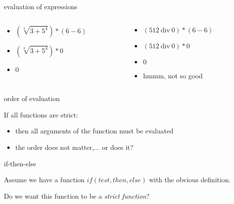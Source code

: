 \begin{frame}{evaluation of expressions}
\begin{columns}
 \begin{column}{0.5\linewidth}
  \begin{itemize}
   \pause \item $(\sqrt[3]{3 + 5^4}) * (6 - 6)$
   \pause \item $(\sqrt[3]{3 + 5^4}) * 0$
   \pause \item $0$
  \end{itemize}   
 \end{column}
 \begin{column}{0.5\linewidth}
  \begin{itemize}
   \pause \item $(512\ \mathrm{div}\ 0) * (6 - 6)$
   \pause \item $(512\ \mathrm{div}\ 0) * 0$
   \pause \item $0$
   \pause \item hmmm, not so good
  \end{itemize}   
 \end{column}
\end{columns}
\end{frame}

\begin{frame}{order of evaluation}

\vspace{20pt}\hspace{60pt}\parbox[l][60pt][l]{300pt}{If all functions are strict:
\begin{itemize}
\pause \item then all arguments of the function must be evaluated
\pause \item the order does not matter\pause ,... or does it?
\end{itemize}}

\end{frame}

\begin{frame}{if-then-else}

  Assume we have a function $if(test, then, else)$ with the obvious definition.

  \pause \vspace{20pt}

  Do we want this function to be a {\em strict function}?
  
\end{frame}



